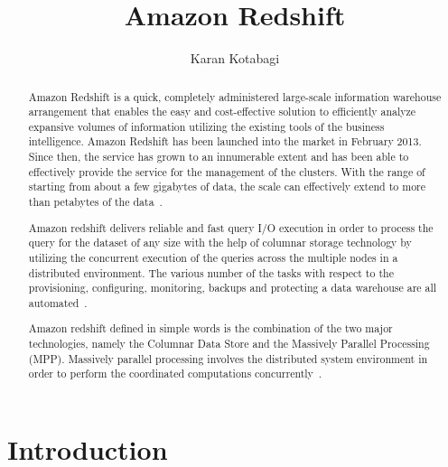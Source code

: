 \title{Amazon Redshift}

\author{Karan Kotabagi}

\begin{abstract}
	Amazon Redshift is a quick, completely administered large-scale 
	information warehouse arrangement that enables the easy and 
	cost-effective solution to efficiently analyze expansive volumes 
	of information utilizing the existing tools of the business 
	intelligence. Amazon Redshift has been launched into the market in 
	February 2013. Since then, the service has grown to an innumerable 
	extent and has been able to effectively provide the service for the 
	management of the clusters. With the range of starting from about a 
	few gigabytes of data, the scale can effectively extend to more 
	than petabytes of the 
	data~\cite{hid-sp18-412-hid-sp18-412_Gupta_2015_ARC}.
    
	Amazon redshift delivers reliable and fast query I/O execution in order 
	to process the query for the dataset of any size with the help of 
	columnar storage technology by utilizing the concurrent execution 
	of the queries across the multiple nodes in a distributed environment. 
	The various number of the tasks with respect to the provisioning, 
	configuring, monitoring, backups and protecting a 
	data warehouse are all automated~\cite{hid-sp18-412-Aws_Tech_Target}. 
	
	Amazon redshift defined in simple words is the combination of the 
	two major technologies, namely the Columnar Data Store and the 
	Massively Parallel Processing (MPP). Massively parallel processing 
	involves the distributed system environment in order to perform the 
	coordinated computations 
	concurrently~\cite{hid-sp18-412-what-is-amazon-redshift-aws}.

\end{abstract}


\maketitle

\section{Introduction}

